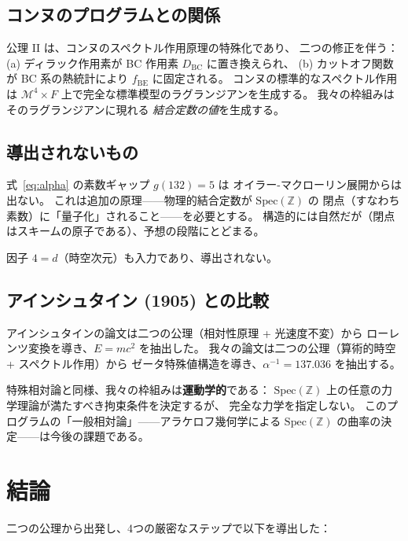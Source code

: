 \documentclass[11pt,a4paper]{article}
\newcommand{\Spec}{\mathrm{Spec}}
\begin{document}
\subsection{コンヌのプログラムとの関係}

公理 II は、コンヌのスペクトル作用原理の特殊化であり、
二つの修正を伴う：
(a) ディラック作用素が BC 作用素 $D_{\mathrm{BC}}$ に置き換えられ、
(b) カットオフ関数が BC 系の熱統計により $f_{\mathrm{BE}}$ に固定される。
コンヌの標準的なスペクトル作用は
$\mathcal{M}^4\times F$ 上で完全な標準模型のラグランジアンを生成する。
我々の枠組みはそのラグランジアンに現れる
\textit{結合定数の値}を生成する。

\subsection{導出されないもの}

式~\eqref{eq:alpha} の素数ギャップ $g(132)=5$ は
オイラー-マクローリン展開からは出ない。
これは追加の原理——物理的結合定数が $\Spec(\mathbb{Z})$ の
閉点（すなわち素数）に「量子化」されること——を必要とする。
構造的には自然だが（閉点はスキームの原子である）、予想の段階にとどまる。

因子 $4=d$（時空次元）も入力であり、導出されない。

\subsection{アインシュタイン (1905) との比較}

アインシュタインの論文は二つの公理（相対性原理 + 光速度不変）から
ローレンツ変換を導き、$E=mc^2$ を抽出した。
我々の論文は二つの公理（算術的時空 + スペクトル作用）から
ゼータ特殊値構造を導き、$\alpha^{-1}=137.036$ を抽出する。

特殊相対論と同様、我々の枠組みは\textbf{運動学的}である：
$\Spec(\mathbb{Z})$ 上の任意の力学理論が満たすべき拘束条件を決定するが、
完全な力学を指定しない。
このプログラムの「一般相対論」——アラケロフ幾何学による
$\Spec(\mathbb{Z})$ の曲率の決定——は今後の課題である。

\section{結論}

二つの公理から出発し、4つの厳密なステップで以下を導出した：
\end{document}
